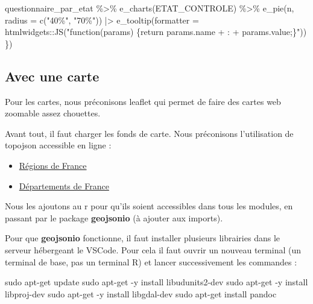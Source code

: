 \documentclass[
  letterpaper,
  DIV=11,
  numbers=noendperiod]{scrreprt}
\newenvironment{Shaded}{\begin{snugshade}}{\end{snugshade}}
\newcommand{\AttributeTok}[1]{\textcolor[rgb]{0.40,0.45,0.13}{#1}}
\newcommand{\FunctionTok}[1]{\textcolor[rgb]{0.28,0.35,0.67}{#1}}
\newcommand{\NormalTok}[1]{\textcolor[rgb]{0.00,0.23,0.31}{#1}}
\newcommand{\OperatorTok}[1]{\textcolor[rgb]{0.37,0.37,0.37}{#1}}
\newcommand{\SpecialCharTok}[1]{\textcolor[rgb]{0.37,0.37,0.37}{#1}}
\newcommand{\StringTok}[1]{\textcolor[rgb]{0.13,0.47,0.30}{#1}}
\providecommand{\tightlist}{%
  \setlength{\itemsep}{0pt}\setlength{\parskip}{0pt}}\usepackage{longtable,booktabs,array}
\begin{document}
\begin{Shaded}
\begin{Highlighting}[]
\NormalTok{       questionnaire\_par\_etat }\SpecialCharTok{\%\textgreater{}\%}
        \FunctionTok{e\_charts}\NormalTok{(ETAT\_CONTROLE) }\SpecialCharTok{\%\textgreater{}\%}
        \FunctionTok{e\_pie}\NormalTok{(n, }\AttributeTok{radius =} \FunctionTok{c}\NormalTok{(}\StringTok{"40\%"}\NormalTok{, }\StringTok{"70\%"}\NormalTok{)) }\SpecialCharTok{|\textgreater{}}
        \FunctionTok{e\_tooltip}\NormalTok{(}\AttributeTok{formatter =}\NormalTok{ htmlwidgets}\SpecialCharTok{::}\FunctionTok{JS}\NormalTok{(}\StringTok{"function(params) \{return params.name + \textquotesingle{}: \textquotesingle{} + params.value;\}"}\NormalTok{))}
\NormalTok{    \})}
\end{Highlighting}
\end{Shaded}

\hypertarget{avec-une-carte}{%
\subsection{Avec une carte}\label{avec-une-carte}}

Pour les cartes, nous préconisons leaflet qui permet de faire des cartes
web zoomable assez chouettes.

Avant tout, il faut charger les fonds de carte. Nous préconisons
l'utilisation de topojson accessible en ligne :

\begin{itemize}
\tightlist
\item
  \href{https://raw.githubusercontent.com/neocarto/resources/master/geometries/France/regions.topojson}{Régions
  de France}
\item
  \href{https://raw.githubusercontent.com/neocarto/resources/master/geometries/France/departements.topojson}{Départements
  de France}
\end{itemize}

Nous les ajoutons au r pour qu'ils soient accessibles dans tous les
modules, en passant par le package \textbf{geojsonio} (à ajouter aux
imports).

Pour que \textbf{geojsonio} fonctionne, il faut installer plusieurs
librairies dans le serveur hébergeant le VSCode. Pour cela il faut
ouvrir un nouveau terminal (un terminal de base, pas un terminal R) et
lancer successivement les commandes :

\begin{Shaded}
\begin{Highlighting}[]
\NormalTok{sudo apt}\OperatorTok{{-}}\NormalTok{get update}
\NormalTok{sudo apt}\OperatorTok{{-}}\NormalTok{get }\OperatorTok{{-}}\NormalTok{y install libudunits2}\OperatorTok{{-}}\NormalTok{dev}
\NormalTok{sudo apt}\OperatorTok{{-}}\NormalTok{get }\OperatorTok{{-}}\NormalTok{y install libproj}\OperatorTok{{-}}\NormalTok{dev}
\NormalTok{sudo apt}\OperatorTok{{-}}\NormalTok{get }\OperatorTok{{-}}\NormalTok{y install libgdal}\OperatorTok{{-}}\NormalTok{dev}
\NormalTok{sudo apt}\OperatorTok{{-}}\NormalTok{get install pandoc}
\end{Highlighting}
\end{Shaded}
\end{document}
